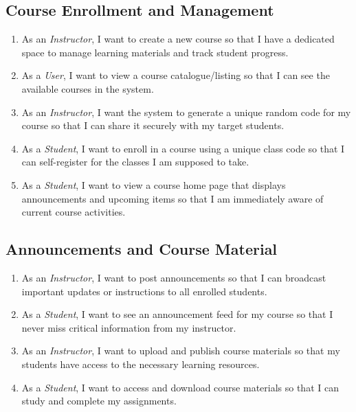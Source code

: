 \documentclass[11pt, legalpaper]{article}
\begin{document}
\subsection{Course Enrollment and Management}
\begin{enumerate}[label=\textbf{US\,\arabic*}, start=5]
  \item As an \emph{Instructor}, I want to create a new course so that I have
        a dedicated space to manage learning materials and track student
        progress.
  \item As a \emph{User}, I want to view a course catalogue/listing so that I
        can see the available courses in the system.
  \item As an \emph{Instructor}, I want the system to generate a unique random
        code for my course so that I can share it securely with my target
        students.
  \item As a \emph{Student}, I want to enroll in a course using a unique class
        code so that I can self-register for the classes I am supposed to take.
  \item As a \emph{Student}, I want to view a course home page that displays
        announcements and upcoming items so that I am immediately aware of
        current course activities.
\end{enumerate}

\subsection{Announcements and Course Material}
\begin{enumerate}[label=\textbf{US\,\arabic*}, start=10]
  \item As an \emph{Instructor}, I want to post announcements so that I can
        broadcast important updates or instructions to all enrolled students.
  \item As a \emph{Student}, I want to see an announcement feed for my course
        so that I never miss critical information from my instructor.
  \item As an \emph{Instructor}, I want to upload and publish course materials
        so that my students have access to the necessary learning resources.
  \item As a \emph{Student}, I want to access and download course materials so
        that I can study and complete my assignments.
\end{enumerate}
\end{document}
